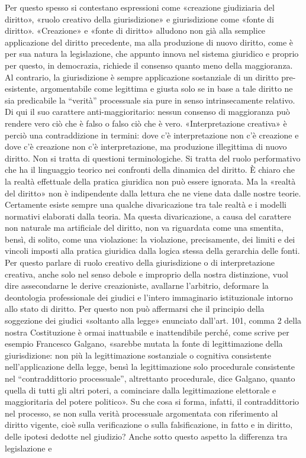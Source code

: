 \begin{comment}
giuridica della) loro contraddizione o della loro compatibilità logica.

\end{comment}

Per questo spesso si contestano espressioni come «creazione giudiziaria del diritto», «ruolo creativo della giurisdizione» e giurisdizione come «fonte di diritto». «Creazione» e «fonte di diritto» alludono non già alla semplice applicazione del diritto precedente, ma alla produzione di nuovo diritto, come è per sua natura la legislazione, che appunto innova nel sistema giuridico e proprio per questo, in democrazia, richiede il consenso quanto meno della maggioranza. Al contrario, la giurisdizione è sempre applicazione sostanziale di un diritto pre-esistente, argomentabile come legittima e giusta solo se in base a tale diritto ne sia predicabile la “verità” processuale sia pure in senso intrinsecamente relativo. Di qui il suo carattere anti-maggioritario: nessun consenso di maggioranza può rendere vero ciò che è falso o falso ciò che è vero. «Interpretazione creativa» è perciò una contraddizione in termini: dove c’è interpretazione non c’è creazione e dove c’è creazione non c’è interpretazione, ma produzione illegittima di nuovo diritto. Non si tratta di questioni terminologiche. Si tratta del ruolo performativo che ha il linguaggio teorico nei confronti della dinamica del diritto. È chiaro che la realtà effettuale della pratica giuridica non può essere ignorata. Ma la «realtà del diritto» non è indipendente dalla lettura che ne viene data dalle nostre teorie. Certamente esiste sempre una qualche divaricazione tra tale realtà e i modelli normativi elaborati dalla teoria. Ma questa divaricazione, a causa del carattere non naturale ma artificiale del diritto, non va riguardata come una smentita, bensì, di solito, come una violazione: la violazione, precisamente, dei limiti e dei vincoli imposti alla pratica giuridica dalla logica stessa della gerarchia delle fonti. Per questo parlare di ruolo creativo della giurisdizione o di interpretazione creativa, anche solo nel senso debole e improprio della nostra distinzione, vuol dire assecondarne le derive creazioniste, avallarne l’arbitrio, deformare la deontologia professionale dei giudici e l’intero immaginario istituzionale intorno allo stato di diritto. Per questo non può affermarsi che il principio della soggezione dei giudici «soltanto alla legge» enunciato dall’art. 101, comma 2 della nostra Costituzione è ormai inattuabile e inattendibile perché, come scrive per esempio Francesco Galgano, «sarebbe mutata la fonte di legittimazione della giurisdizione: non più la legittimazione sostanziale o cognitiva consistente nell’applicazione della legge, bensì la legittimazione solo procedurale consistente nel “contraddittorio processuale”, altrettanto procedurale, dice Galgano, quanto quella di tutti gli altri poteri, a cominciare dalla legittimazione elettorale e maggioritaria del potere politico». Su che cosa si forma, infatti, il contraddittorio nel processo, se non sulla verità processuale argomentata con riferimento al diritto vigente, cioè sulla verificazione o sulla falsificazione, in fatto e in diritto, delle ipotesi dedotte nel giudizio? Anche sotto questo aspetto la differenza tra legislazione e 